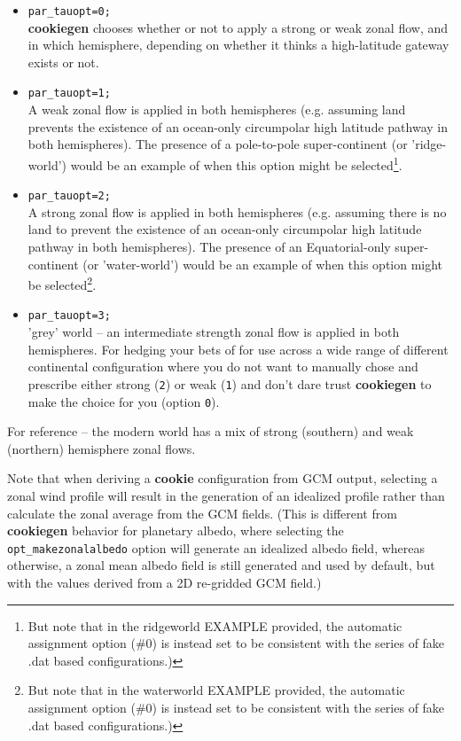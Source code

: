 \vspace{1mm}
\begin{itemize}
\item \texttt{par\_tauopt=0;}
\\\textbf{cookiegen} chooses whether or not to apply a strong or weak zonal flow, and in which hemisphere, depending on whether it thinks a high-latitude gateway exists or not.
\item \texttt{par\_tauopt=1;}
\\A weak zonal flow is applied in both hemispheres (e.g. assuming land prevents the existence of an ocean-only circumpolar high latitude pathway  in both hemispheres).
The presence of a pole-to-pole super-continent (or 'ridge-world') would be an example of when this option might be selected\footnote{But note that in the ridgeworld EXAMPLE provided, the automatic assignment option (\#0) is instead set to be consistent with the series of fake .dat based configurations.)}.
\item \texttt{par\_tauopt=2;}
\\A strong zonal flow is applied in both hemispheres (e.g. assuming there is no land to prevent the existence of an ocean-only circumpolar high latitude pathway  in both hemispheres). The presence of an Equatorial-only super-continent (or 'water-world') would be an example of when this option might be selected\footnote{But note that in the waterworld EXAMPLE provided, the automatic assignment option (\#0) is instead set to be consistent with the series of fake .dat based configurations.)}.
\item \texttt{par\_tauopt=3;}
\\'grey' world -- an intermediate strength zonal flow is applied in both hemispheres. For hedging your bets of for use across a wide range of different continental configuration where you do not want to manually chose and prescribe either strong (\texttt{2}) or weak (\texttt{1}) and don't dare trust \textbf{cookiegen} to make the choice for you (option \texttt{0}).
\end{itemize}

\vspace{1mm}
For reference -- the modern world has a mix of strong (southern) and weak (northern) hemisphere zonal flows.

\vspace{1mm}
\noindent Note that when deriving a \textbf{cookie} configuration from GCM output, selecting a zonal wind profile will result in the generation of an idealized profile rather than calculate the zonal average from the GCM fields. (This is different from \textbf{cookiegen} behavior for planetary albedo, where selecting the \texttt{ opt\_makezonalalbedo} option will generate an idealized albedo field, whereas otherwise, a zonal mean albedo field is still generated and used by default, but with the values derived from a 2D re-gridded GCM field.)

